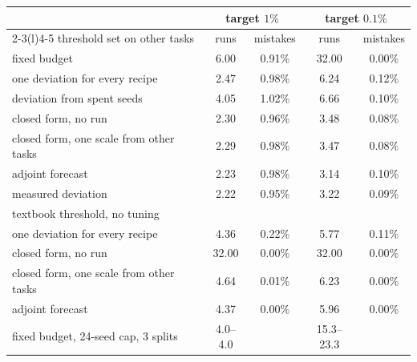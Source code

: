 \footnotesize
\setlength{\tabcolsep}{3pt}
\begin{tabular}{@{}lcccc@{}}
\toprule
 & \multicolumn{2}{c}{target $1\%$} & \multicolumn{2}{c}{target $0.1\%$} \\
\cmidrule(lr){2-3}\cmidrule(l){4-5}
threshold set on other tasks & runs & mistakes & runs & mistakes \\
\midrule
fixed budget & 6.00 & 0.91\% & 32.00 & 0.00\% \\
one deviation for every recipe & 2.47 & 0.98\% & 6.24 & 0.12\% \\
deviation from spent seeds & 4.05 & 1.02\% & 6.66 & 0.10\% \\
closed form, no run & 2.30 & 0.96\% & 3.48 & 0.08\% \\
closed form, one scale from other tasks & 2.29 & 0.98\% & 3.47 & 0.08\% \\
adjoint forecast & 2.23 & 0.98\% & 3.14 & 0.10\% \\
measured deviation & 2.22 & 0.95\% & 3.22 & 0.09\% \\
\midrule
textbook threshold, no tuning & & & & \\
\quad one deviation for every recipe & 4.36 & 0.22\% & 5.77 & 0.11\% \\
\quad closed form, no run & 32.00 & 0.00\% & 32.00 & 0.00\% \\
\quad closed form, one scale from other tasks & 4.64 & 0.01\% & 6.23 & 0.00\% \\
\quad adjoint forecast & 4.37 & 0.00\% & 5.96 & 0.00\% \\
\midrule
fixed budget, 24-seed cap, 3 splits & 4.0--4.0 & & 15.3--23.3 & \\
\bottomrule
\end{tabular}
